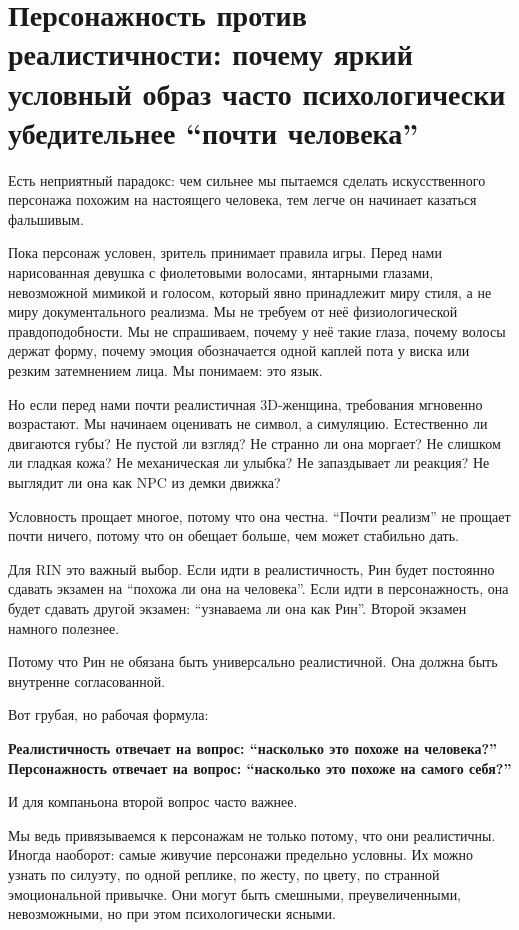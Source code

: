 \section{Персонажность против реалистичности: почему яркий условный образ часто психологически убедительнее “почти человека”}

Есть неприятный парадокс: чем сильнее мы пытаемся сделать искусственного
персонажа похожим на настоящего человека, тем легче он начинает казаться
фальшивым.

Пока персонаж условен, зритель принимает правила игры. Перед нами
нарисованная девушка с фиолетовыми волосами, янтарными глазами,
невозможной мимикой и голосом, который явно принадлежит миру стиля, а не
миру документального реализма. Мы не требуем от неё физиологической
правдоподобности. Мы не спрашиваем, почему у неё такие глаза, почему
волосы держат форму, почему эмоция обозначается одной каплей пота у
виска или резким затемнением лица. Мы понимаем: это язык.

Но если перед нами почти реалистичная 3D-женщина, требования мгновенно
возрастают. Мы начинаем оценивать не символ, а симуляцию. Естественно ли
двигаются губы? Не пустой ли взгляд? Не странно ли она моргает? Не
слишком ли гладкая кожа? Не механическая ли улыбка? Не запаздывает ли
реакция? Не выглядит ли она как NPC из демки движка?

Условность прощает многое, потому что она честна. ``Почти реализм'' не
прощает почти ничего, потому что он обещает больше, чем может стабильно
дать.

Для RIN это важный выбор. Если идти в реалистичность, Рин будет
постоянно сдавать экзамен на ``похожа ли она на человека''. Если идти в
персонажность, она будет сдавать другой экзамен: ``узнаваема ли она как
Рин''. Второй экзамен намного полезнее.

Потому что Рин не обязана быть универсально реалистичной. Она должна
быть внутренне согласованной.

Вот грубая, но рабочая формула:

\textbf{Реалистичность отвечает на вопрос: ``насколько это похоже на
человека?'' Персонажность отвечает на вопрос: ``насколько это похоже на
самого себя?''}

И для компаньона второй вопрос часто важнее.

Мы ведь привязываемся к персонажам не только потому, что они
реалистичны. Иногда наоборот: самые живучие персонажи предельно условны.
Их можно узнать по силуэту, по одной реплике, по жесту, по цвету, по
странной эмоциональной привычке. Они могут быть смешными,
преувеличенными, невозможными, но при этом психологически ясными.

